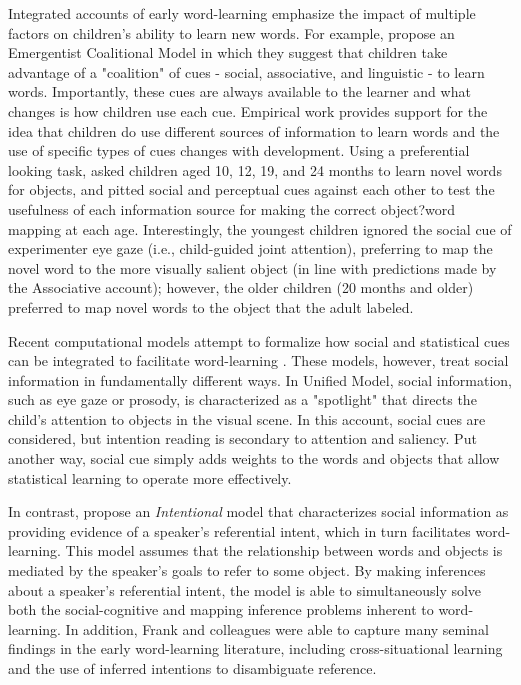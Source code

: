 \documentclass[man]{apa2}
\begin{document}
Integrated accounts of early word-learning emphasize the impact of multiple factors on children's ability to learn new words. For example,  propose an Emergentist Coalitional Model in which they suggest that children take advantage of a "coalition" of cues - social, associative, and linguistic - to learn words. Importantly, these cues are always available to the learner and what changes is how children use each cue. Empirical work provides support for the idea that children do use different sources of information to learn words and the use of specific types of cues changes with development. Using a preferential looking task,  asked children aged 10, 12, 19, and 24 months to learn novel words for objects, and pitted social and perceptual cues against each other to test the usefulness of each information source for making the correct object?word mapping at each age. Interestingly, the youngest children ignored the social cue of experimenter eye gaze (i.e., child-guided joint attention), preferring to map the novel word to the more visually salient object (in line with predictions made by the Associative account);  however, the older children (20 months and older) preferred to map novel words to the object that the adult labeled. 

Recent computational models attempt to formalize how social and statistical cues can be integrated to facilitate word-learning \cite{yu2007unified,frank2009using}. These models, however, treat social information in fundamentally different ways. In  Unified Model, social information, such as eye gaze or prosody, is characterized as a "spotlight" that directs the child's attention to objects in the visual scene. In this account, social cues are considered, but intention reading is secondary to attention and saliency. Put another way, social cue simply adds weights to the words and objects that allow statistical learning to operate more effectively. 

In contrast, \cite{frank2009using} propose an \emph{Intentional} model that characterizes social information as providing evidence of a speaker's referential intent, which in turn facilitates word-learning. This model assumes that the relationship between words and objects is mediated by the speaker's goals to refer to some object. By making inferences about a speaker's referential intent, the model is able to simultaneously solve both the social-cognitive and mapping inference problems inherent to word-learning. In addition, Frank and colleagues were able to capture many seminal findings in the early word-learning literature, including cross-situational learning and the use of inferred intentions to disambiguate reference.
\end{document}
